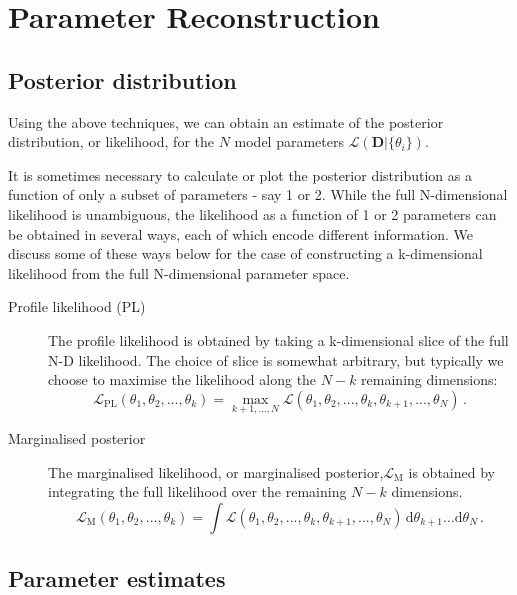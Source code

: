 \chapter{Parameter Reconstruction}

\section{Posterior distribution}

Using the above techniques, we can obtain an estimate of the posterior distribution, or likelihood, for the \(N\) model parameters \(\mathcal{L}(\textbf{D}|\{\theta_i\})\).

It is sometimes necessary to calculate or plot the posterior distribution as a function of only a subset of parameters - say 1 or 2. While the full N-dimensional likelihood is unambiguous, the likelihood as a function of 1 or 2 parameters can be obtained in several ways, each of which encode different information. We discuss some of these ways below for the case of constructing a k-dimensional likelihood from the full N-dimensional parameter space.

\begin{description}
\item[Profile likelihood (PL)] The profile likelihood is obtained by taking a k-dimensional slice of the full N-D likelihood. The choice of slice is somewhat arbitrary, but typically we choose to maximise the likelihood along the \(N-k\) remaining dimensions:
\begin{equation}
\mathcal{L}_{\textrm{PL}}(\theta_1,\theta_2,...,\theta_k) = \max_{k+1,...,N} \mathcal{L}(\theta_1,\theta_2,...,\theta_k,\theta_{k+1},...,\theta_N)\,.
\end{equation}
\item[Marginalised posterior] The marginalised likelihood, or marginalised posterior,\(\mathcal{L}_{\textrm{M}}\) is obtained by integrating the full likelihood over the remaining \(N-k\) dimensions.
\begin{equation}
\mathcal{L}_\textrm{M}(\theta_1,\theta_2,...,\theta_k) = \int \mathcal{L}(\theta_1,\theta_2,...,\theta_k,\theta_{k+1},...,\theta_N) \, \textrm{d}\theta_{k+1} ... \textrm{d}\theta_N \,.
\end{equation}
\end{description}

\section{Parameter estimates}

